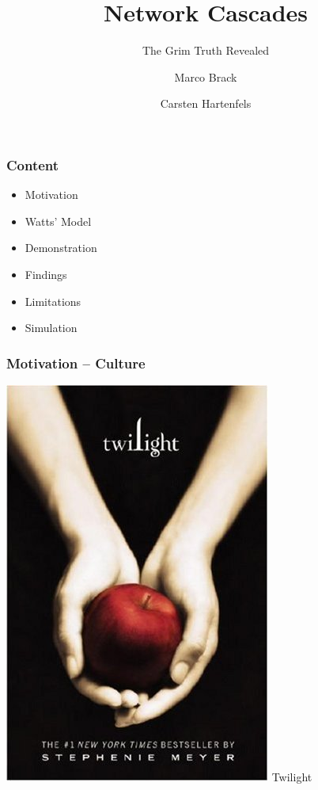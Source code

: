 \documentclass[slidestop,usenames,dvipsnames]{beamer}
\title{Network Cascades}
\subtitle{The Grim Truth Revealed}
\author{Marco Brack \and Carsten Hartenfels}
\newcommand{\gitem}{\vfill\item}
\begin{document}
\begin{frame}
    \titlepage
\end{frame}




\begin{frame}
    \frametitle{Content}
    \begin{itemize}
        \gitem Motivation
        \gitem Watts' Model
        \gitem Demonstration
        \gitem Findings
        \gitem Limitations
        \gitem Simulation
    \end{itemize}
    \vfill
\end{frame}


\begin{frame}
    \frametitle{Motivation -- Culture}
    \begin{center}
        \includegraphics[height=0.7\textheight]{img/twilight}
        \vfill\vspace{8pt}
        {\huge Twilight}
    \end{center}
    \vfill
\end{frame}
\end{document}
